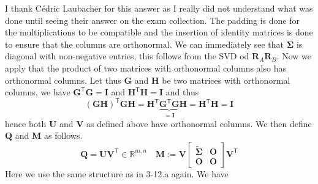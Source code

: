 \documentclass{article}
\newcommand\tr{\mathsf{T}}
\begin{document}
I thank Cédric Laubacher for this answer as I really did not understand what was done until seeing their answer on the exam collection. The padding is done for the multiplications to be compatible and the insertion of identity matrices is done to ensure that the columns are orthonormal. We can immediately see that $\mathbf{\Sigma}$ is diagonal with non-negative entries, this follows from the SVD od $\mathbf{R}_{A}\mathbf{R}_{B}$. Now we apply that the product of two matrices with orthonormal columns also has orthonormal columns. Let thus $\mathbf{G}$ and $\mathbf{H}$ be two matrices with orthonormal columns, we have $\mathbf{G}^{\tr}\mathbf{G} = \mathbf{I}$ and $\mathbf{H}^{\tr}\mathbf{H} = \mathbf{I}$ and thus
\begin{equation*}
    \left(\mathbf{G}\mathbf{H}\right)^{\tr}\mathbf{G}\mathbf{H} = \mathbf{H}^{\tr}\underbrace{\mathbf{G}^{\tr}\mathbf{G}}_{= \mathbf{I}}\mathbf{H} = \mathbf{H}^{\tr}\mathbf{H} = \mathbf{I}
\end{equation*}
hence both $\mathbf{U}$ and $\mathbf{V}$ as defined above have orthonormal columns. We then define $\mathbf{Q}$ and $\mathbf{M}$ as follows.
\begin{equation*}
    \mathbf{Q} = \mathbf{U}\mathbf{V}^{\tr} \in \mathbb{R}^{m,n} \quad \mathbf{M} := \mathbf{V}\begin{bmatrix}
        \mathbf{\tilde{\Sigma}} &\mathbf{O} \\
        \mathbf{O} & \mathbf{O}
    \end{bmatrix}\mathbf{V}^{\tr}
\end{equation*}
Here we use the same structure as in 3-12.a again. We have
\end{document}

